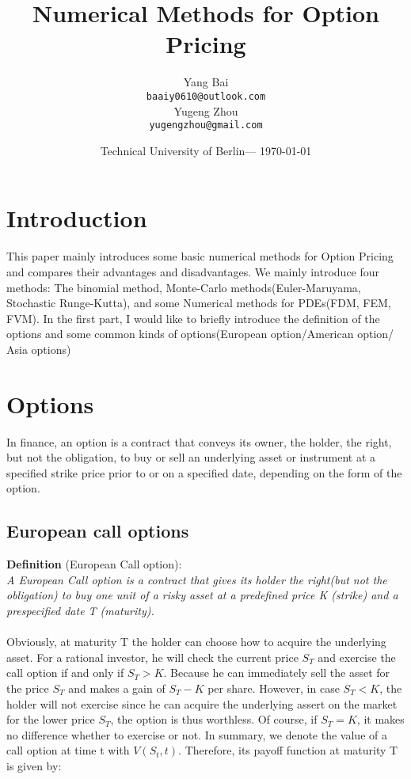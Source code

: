 \documentclass{article}
\title{Numerical Methods for Option Pricing} %
\author{Yang Bai\\ \texttt{baaiy0610@outlook.com}\\Yugeng Zhou\\\texttt{yugengzhou@gmail.com}} %
\date{Technical University of Berlin--- \today} %
\begin{document}
\maketitle %


\section*{Introduction} %
This paper mainly introduces some basic numerical methods for Option Pricing and compares their advantages and disadvantages. We mainly introduce four methods: The binomial method, Monte-Carlo methods(Euler-Maruyama, Stochastic Runge-Kutta), and some Numerical methods for PDEs(FDM, FEM, FVM). 
In the first part, I would like to briefly introduce the definition of the options and some common kinds of options(European option/American option/ Asia options)


\section{Options}
In finance, an option is a contract that conveys its owner, the holder, the right, but not the obligation, to buy or sell an underlying asset or instrument at a specified strike price prior to or on a specified date, depending on the form of the option.
\subsection{European call options}
\textbf{Definition} (European Call option):\\
\textit{A European Call option is a contract that gives its holder the right(but not the obligation) to buy one unit of a risky asset at a predefined price K (strike) and a prespecified date T (maturity).}\\~\\
Obviously, at maturity T the holder can choose how to acquire the underlying asset. For a rational investor, he will check the current price $S_{T}$ and exercise the call option if and only if $S_{T}>K$. Because he can immediately sell the asset for the price $S_{T}$ and makes a gain of $S_{T}-K$ per share. However, in case $S_{T}<K$, the holder will not exercise since he can acquire the underlying assert on the market for the lower price $S_{T}$, the option is thus worthless. Of course, if $S_{T}=K$, it makes no difference whether to exercise or not. In summary, we denote the value of a call option at time t with $V(S_{t},t)$. Therefore, its payoff function at maturity T is given by:
\end{document}
